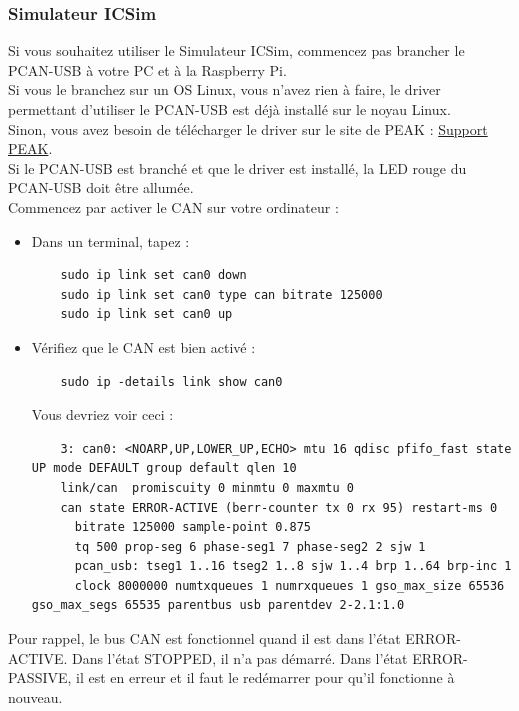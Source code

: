 \subsubsection{Simulateur ICSim}

Si vous souhaitez utiliser le Simulateur ICSim, commencez pas brancher le PCAN-USB à votre PC et à la Raspberry Pi.\\
Si vous le branchez sur un OS Linux, vous n'avez rien à faire, le driver permettant d'utiliser le PCAN-USB est déjà installé sur le noyau Linux.\\
Sinon, vous avez besoin de télécharger le driver sur le site de PEAK : \href{https://www.peak-system.com/PCAN-USB.199.0.html?&L=2}{Support PEAK}.\\
Si le PCAN-USB est branché et que le driver est installé, la LED rouge du PCAN-USB doit être allumée.\\

Commencez par activer le CAN sur votre ordinateur : 
\begin{itemize}
    \item Dans un terminal, tapez :
\vspace{-1.8\baselineskip} 
\begin{lstlisting}
    sudo ip link set can0 down
    sudo ip link set can0 type can bitrate 125000
    sudo ip link set can0 up
\end{lstlisting}
    \item Vérifiez que le CAN est bien activé :
\vspace{-1.8\baselineskip} 
\begin{lstlisting}
    sudo ip -details link show can0
\end{lstlisting}
Vous devriez voir ceci : 
\vspace{-1.8\baselineskip}
\begin{lstlisting}
    3: can0: <NOARP,UP,LOWER_UP,ECHO> mtu 16 qdisc pfifo_fast state UP mode DEFAULT group default qlen 10
    link/can  promiscuity 0 minmtu 0 maxmtu 0 
    can state ERROR-ACTIVE (berr-counter tx 0 rx 95) restart-ms 0 
	  bitrate 125000 sample-point 0.875 
	  tq 500 prop-seg 6 phase-seg1 7 phase-seg2 2 sjw 1
	  pcan_usb: tseg1 1..16 tseg2 1..8 sjw 1..4 brp 1..64 brp-inc 1
	  clock 8000000 numtxqueues 1 numrxqueues 1 gso_max_size 65536 gso_max_segs 65535 parentbus usb parentdev 2-2.1:1.0 
\end{lstlisting}
\end{itemize}

Pour rappel, le bus CAN est fonctionnel quand il est dans l'état ERROR-ACTIVE. Dans l'état STOPPED, il n'a pas démarré. Dans l'état ERROR-PASSIVE, il est en erreur et il faut le redémarrer pour qu'il fonctionne à nouveau.\\

